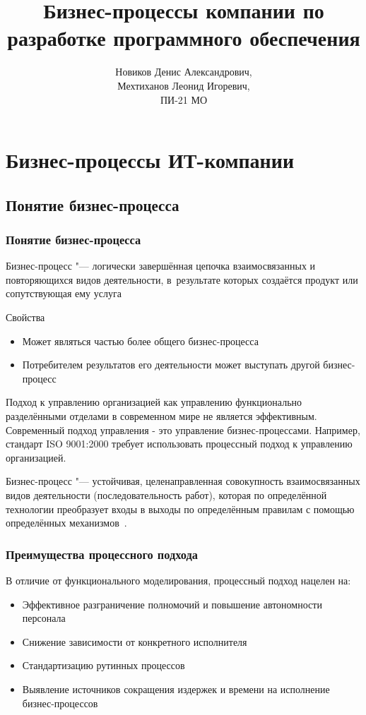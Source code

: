 \documentclass{../industrial-development}
\title{Бизнес-процессы компании по разработке программного обеспечения}
\author{Новиков Денис Александрович, \\Мехтиханов Леонид Игоревич, \\ПИ-21 МО}
\date{}
\begin{document}
\begin{frame}
  \titlepage
\end{frame}


\section{Бизнес-процессы ИТ-компании}

\subsection{Понятие бизнес-процесса}


\begin{frame} \frametitle{Понятие бизнес-процесса}
	\begin{block}{}
		\alert{Бизнес-процесс} "--- логически завершённая цепочка взаимосвязанных и повторяющихся видов деятельности, в~результате которых создаётся продукт или сопутствующая ему услуга
	\end{block}
	\begin{block}{Свойства}
		\begin{itemize}
			\item Может являться частью более общего бизнес-процесса
			\item Потребителем результатов его деятельности может выступать другой бизнес-процесс
		\end{itemize}
	\end{block}
\end{frame}

\lecturenotes

Подход к управлению организацией как управлению функционально разделёнными отделами в современном мире не является эффективным.  Современный подход управления - это управление бизнес-процессами. Например, стандарт ISO 9001:2000 требует использовать процессный подход к управлению организацией.

Бизнес-процесс "--- устойчивая, целенаправленная совокупность взаимосвязанных видов деятельности (последовательность работ), которая по определённой технологии преобразует входы в выходы по определённым правилам с помощью определённых механизмов~\cite{BStudio}.


\begin{frame} \frametitle{Преимущества процессного подхода}
	В отличие от функционального моделирования, процессный подход нацелен на:
	\begin{itemize}
		\item Эффективное разграничение полномочий и повышение автономности персонала
		\item Снижение зависимости от конкретного исполнителя
		\item Стандартизацию рутинных процессов
		\item Выявление источников сокращения издержек и времени на исполнение бизнес-процессов
	\end{itemize}
\end{frame}
\end{document}
